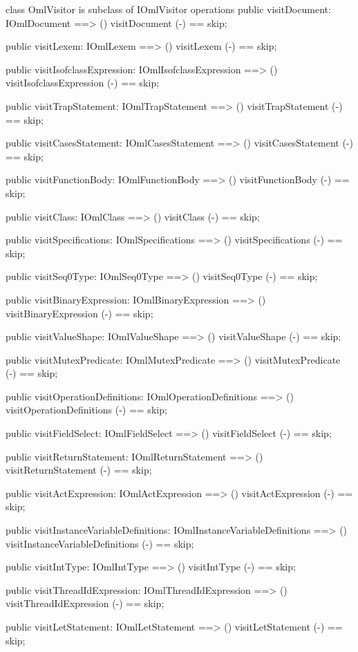 \begin{vdm_al}
class OmlVisitor is subclass of IOmlVisitor
operations
  public visitDocument: IOmlDocument ==> ()
  visitDocument (-) == skip;

  public visitLexem: IOmlLexem ==> ()
  visitLexem (-) == skip;

  public visitIsofclassExpression: IOmlIsofclassExpression ==> ()
  visitIsofclassExpression (-) == skip;

  public visitTrapStatement: IOmlTrapStatement ==> ()
  visitTrapStatement (-) == skip;

  public visitCasesStatement: IOmlCasesStatement ==> ()
  visitCasesStatement (-) == skip;

  public visitFunctionBody: IOmlFunctionBody ==> ()
  visitFunctionBody (-) == skip;

  public visitClass: IOmlClass ==> ()
  visitClass (-) == skip;

  public visitSpecifications: IOmlSpecifications ==> ()
  visitSpecifications (-) == skip;

  public visitSeq0Type: IOmlSeq0Type ==> ()
  visitSeq0Type (-) == skip;

  public visitBinaryExpression: IOmlBinaryExpression ==> ()
  visitBinaryExpression (-) == skip;

  public visitValueShape: IOmlValueShape ==> ()
  visitValueShape (-) == skip;

  public visitMutexPredicate: IOmlMutexPredicate ==> ()
  visitMutexPredicate (-) == skip;

  public visitOperationDefinitions: IOmlOperationDefinitions ==> ()
  visitOperationDefinitions (-) == skip;

  public visitFieldSelect: IOmlFieldSelect ==> ()
  visitFieldSelect (-) == skip;

  public visitReturnStatement: IOmlReturnStatement ==> ()
  visitReturnStatement (-) == skip;

  public visitActExpression: IOmlActExpression ==> ()
  visitActExpression (-) == skip;

  public visitInstanceVariableDefinitions: IOmlInstanceVariableDefinitions ==> ()
  visitInstanceVariableDefinitions (-) == skip;

  public visitIntType: IOmlIntType ==> ()
  visitIntType (-) == skip;

  public visitThreadIdExpression: IOmlThreadIdExpression ==> ()
  visitThreadIdExpression (-) == skip;

  public visitLetStatement: IOmlLetStatement ==> ()
  visitLetStatement (-) == skip;


\end{vdm_al}
